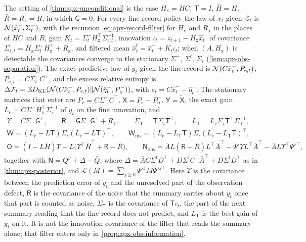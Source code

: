 The setting of \cref{thm:apx-unconditional} is the case $H_{\mathrm x}=HC$, $\mathsf T=I$, $\bar H=H$, $\bar R=R_{\mathrm x}=R$, in which $\mathsf G=0$. For every fine-record policy the law of $x_t$ given $\mathcal Z_t$ is $\mathcal{N}(\hat x^-_t,\Sigma^-_t)$, with the recursion \eqref{eq:apx-record-filter} for $H_{\mathrm x}$ and $R_{\mathrm x}$ in the places of $HC$ and $R$, gain $K_t=\Sigma^-_tH_{\mathrm x}^\top\Sigma_{\iota,t}^{-1}$, innovation $\iota_t=z_{t+1}-H_{\mathrm x}\hat x^-_t$ of covariance $\Sigma_{\iota,t}=H_{\mathrm x}\Sigma^-_tH_{\mathrm x}^\top+R_{\mathrm x}$, and filtered mean $\hat x^{\mathrm f}_t=\hat x^-_t+K_t\iota_t$; when $(A,H_{\mathrm x})$ is detectable the covariances converge to the stationary $\Sigma^-$, $\Sigma^{\mathrm f}$, $\Sigma_\iota$ (\cref{lem:apx-obs-separation}). The exact predictive law of $y_t$ given the fine record is $\mathcal{N}(C\hat x^-_t,P_{\mathrm e,t})$, $P_{\mathrm e,t}=C\Sigma^-_tC^\top$, and the excess relative entropy is $\Delta\mathcal F_t=\mathbb{E}D_{\mathrm{KL}}(\mathcal{N}(C\hat x^-_t,P_{\mathrm e,t})\Vert\mathcal{N}(\hat\eta^-_t,P^-_{\mathrm b}))$, with $e_t=C\hat x^-_t-\hat\eta^-_t$. The stationary matrices that enter are $P_{\mathrm e}=C\Sigma^-C^\top$, $\mathsf X=P_{\mathrm e}-P^-_{\mathrm b}$, $\mathsf Y=\tilde{\mathsf X}$, the exact gain $L_{\mathrm e}=C\Sigma^-H_{\mathrm x}^\top\Sigma_\iota^{-1}$ of $y_t$ on the fine innovation, and
\begin{equation}\label{eq:apx-obs-matrices}
\begin{gathered}
\Upsilon=C\Sigma^-\mathsf G^\top,\qquad\mathsf R=\mathsf G\Sigma^-\mathsf G^\top+R_{\mathsf T},\qquad\Sigma_{\mathsf T}=\mathsf T\Sigma_\iota\mathsf T^\top,\qquad L_{\mathsf T}=L_{\mathrm e}\Sigma_\iota\mathsf T^\top\Sigma_{\mathsf T}^{-1},\\
\mathsf W=(L_{\mathrm e}-L\mathsf T)\Sigma_\iota(L_{\mathrm e}-L\mathsf T)^\top,\qquad\mathsf W_{\mathrm{ins}}=(L_{\mathrm e}-L_{\mathsf T}\mathsf T)\Sigma_\iota(L_{\mathrm e}-L_{\mathsf T}\mathsf T)^\top,\\
\mathsf O=(I-L\bar H)\Upsilon-L\bigl(\Upsilon^\top\bar H^\top+\mathsf R-\bar R\bigr),\qquad\mathsf N_{\mathrm{obs}}=\bar AL(\mathsf R-\bar R)L^\top\bar A^\top-\Psi'\Upsilon L^\top\bar A^\top-\bar AL\Upsilon^\top\Psi'^\top,
\end{gathered}
\end{equation}
together with $\mathsf N=Q^y+\Delta-\bar Q$, where $\Delta=\bar AC\Sigma^{\mathrm f}D^\top+D\Sigma^{\mathrm f}C^\top\bar A^\top+D\Sigma^{\mathrm f}D^\top$ as in \cref{thm:apx-posterior}, and $\mathcal L(M)=\sum_{j\ge0}\Psi'^jM\Psi'^{j\top}$. Here $\Upsilon$ is the covariance between the prediction error of $y_t$ and the unresolved part of the observation defect, $\mathsf R$ is the covariance of the noise that the summary carries about $y_t$ once that part is counted as noise, $\Sigma_{\mathsf T}$ is the covariance of $\mathsf T\iota_t$, the part of the next summary reading that the fine record does not predict, and $L_{\mathsf T}$ is the best gain of $y_t$ on it. It is not the innovation covariance of the filter that reads the summary alone; that filter enters only in \cref{prop:apx-obs-information}.

